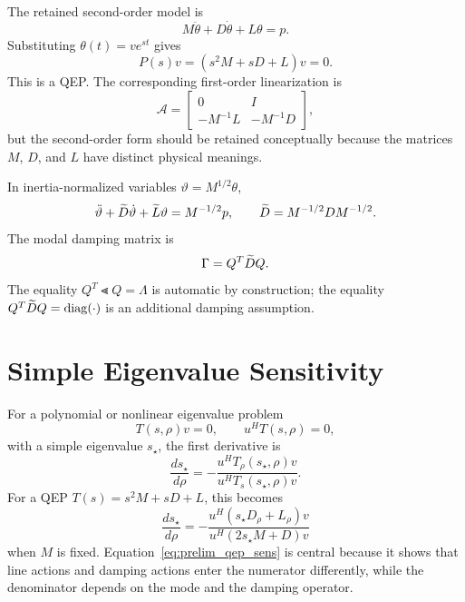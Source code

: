 The retained second-order model is
\begin{equation}
  M\ddot\theta+D\dot\theta+L\theta=p.
  \label{eq:prelim_second_order}
\end{equation}
Substituting \(\theta(t)=ve^{st}\) gives
\begin{equation}
  P(s)v=(s^2M+sD+L)v=0.
  \label{eq:prelim_qep}
\end{equation}
This is a QEP. The corresponding first-order linearization is
\begin{equation}
  \mathcal A=
  \begin{bmatrix}
    0&I\\
    -M^{-1}L&-M^{-1}D
  \end{bmatrix},
  \label{eq:prelim_first_order}
\end{equation}
but the second-order form should be retained conceptually because the matrices
\(M\), \(D\), and \(L\) have distinct physical meanings.

In inertia-normalized variables \(\vartheta=M^{1/2}\theta\),
\begin{equation}
  \ddot\vartheta+\widetilde D\dot\vartheta+\widetilde L\vartheta=M^{-1/2}p,\qquad
  \widetilde D=M^{-1/2}DM^{-1/2}.
  \label{eq:prelim_normalized}
\end{equation}
The modal damping matrix is
\begin{equation}
  \Gamma=Q^T\widetilde D Q.
  \label{eq:prelim_gamma}
\end{equation}
The equality \(Q^T\Lt Q=\Lambda\) is automatic by construction; the equality
\(Q^T\widetilde D Q=\operatorname{diag}(\cdot)\) is an additional damping assumption.

\section{Simple Eigenvalue Sensitivity}

For a polynomial or nonlinear eigenvalue problem
\begin{equation}
  T(s,\rho)v=0,\qquad u^HT(s,\rho)=0,
\end{equation}
with a simple eigenvalue \(s_\star\), the first derivative is
\begin{equation}
  \frac{ds_\star}{d\rho}
  =
  -\frac{u^H T_\rho(s_\star,\rho)v}
  {u^H T_s(s_\star,\rho)v}.
  \label{eq:prelim_nep_sens}
\end{equation}
For a QEP \(T(s)=s^2M+sD+L\), this becomes
\begin{equation}
  \frac{ds_\star}{d\rho}
  =
  -\frac{u^H(s_\star D_\rho+L_\rho)v}
  {u^H(2s_\star M+D)v}
  \label{eq:prelim_qep_sens}
\end{equation}
when \(M\) is fixed. Equation~\eqref{eq:prelim_qep_sens} is central because it
shows that line actions and damping actions enter the numerator differently,
while the denominator depends on the mode and the damping operator.

